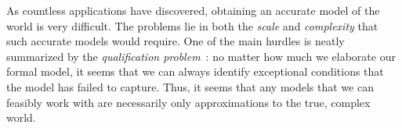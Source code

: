 










As countless applications have discovered, obtaining an accurate model of the world is very difficult. The problems lie in both the {\em scale} and {\em complexity} that such accurate models would require. One of the main hurdles is neatly summarized by the {\em qualification problem}~\cite{mccarthy1987epistemological}: no matter how much we elaborate our formal model, it seems that we can always identify exceptional conditions that the model has failed to capture. Thus, it seems that any models that we can feasibly work with are necessarily only approximations to the true, complex world. 

